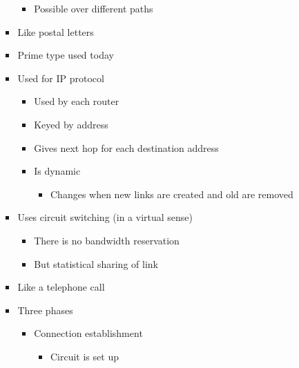 \begin{itemize}
\begin{itemize}
\begin{itemize}
                        \begin{itemize}
                            \item Possible over different paths
                        \end{itemize}
                    \item Like postal letters
                    \item Prime type used today
                    \item Used for IP protocol
                        \begin{itemize}
                            \item Used by each router
                            \item Keyed by address
                            \item Gives next hop for each destination address
                            \item Is dynamic
                                \begin{itemize}
                                    \item Changes when new links are created and old are removed
                                \end{itemize}
                        \end{itemize}
                \end{itemize}
                \begin{itemize}
                    \item Uses circuit switching (in a virtual sense)
                        \begin{itemize}
                            \item There is no bandwidth reservation
                            \item But statistical sharing of link
                        \end{itemize}
                    \item Like a telephone call
                    \item Three phases
                        \begin{itemize}
                            \item Connection establishment
                                \begin{itemize}
                                    \item Circuit is set up

\end{itemize}
\end{itemize}
\end{itemize}
\end{itemize}
\end{itemize}

